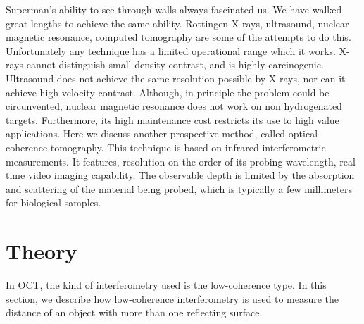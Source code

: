 \documentclass[12pt,twoside,english]{book}
\renewcommand{\~}{\perispomeni}%
\numberwithin{equation}{section}
\numberwithin{figure}{section}
\begin{document}
Superman's ability to see through walls always fascinated us. We have walked great lengths to achieve the same ability. Rottingen X-rays, ultrasound, nuclear magnetic resonance, computed tomography are some of the attempts to do this. Unfortunately any technique has a limited operational range which it works. X-rays cannot distinguish small density contrast, and is highly carcinogenic. Ultrasound does not achieve the same resolution possible by X-rays, nor can it achieve high velocity contrast. Although, in principle the problem could be circunvented, nuclear magnetic resonance does not work on non hydrogenated targets. Furthermore, its high maintenance cost restricts its use to high value applications. Here we discuss another prospective method, called optical coherence tomography. This technique is based on infrared interferometric measurements. It features, resolution on the order of its probing wavelength, real-time video imaging capability. The observable depth is limited by the absorption and scattering of the material being probed, which is typically a few millimeters for biological samples.

\section{Theory}

In OCT, the kind of interferometry used is the low-coherence type. In this section, we describe how low-coherence interferometry is used to measure the distance of an object with more than one reflecting surface.
\end{document}
